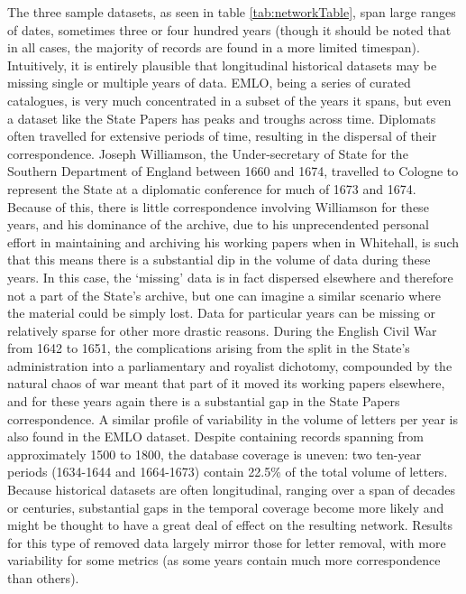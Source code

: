 \documentclass[]{article}
\begin{document}
The three sample datasets, as seen in table \ref{tab:networkTable}, span large ranges of dates, sometimes three or four hundred years (though it should be noted that in all cases, the majority of records are found in a more limited timespan). Intuitively, it is entirely plausible that longitudinal historical datasets may be missing single or multiple years of data. EMLO, being a series of curated catalogues, is very much concentrated in a subset of the years it spans, but even a dataset like the State Papers has peaks and troughs across time. Diplomats often travelled for extensive periods of time, resulting in the dispersal of their correspondence. Joseph Williamson, the Under-secretary of State for the Southern Department of England between 1660 and 1674, travelled to Cologne to represent the State at a diplomatic conference for much of 1673 and 1674. Because of this, there is little correspondence involving Williamson for these years, and his dominance of the archive, due to his unprecendented personal effort in maintaining and archiving his working papers when in Whitehall, is such that this means there is a substantial dip in the volume of data during these years. In this case, the `missing' data is in fact dispersed elsewhere and therefore not a part of the State's archive, but one can imagine a similar scenario where the material could be simply lost. Data for particular years can be missing or relatively sparse for other more drastic reasons. During the English Civil War from 1642 to 1651, the complications arising from the split in the State's administration into a parliamentary and royalist dichotomy, compounded by the natural chaos of war meant that part of it moved its working papers elsewhere, and for these years again there is a substantial gap in the State Papers correspondence. A similar profile of variability in the volume of letters per year is also found in the EMLO dataset. Despite containing records spanning from approximately 1500 to 1800, the database coverage is uneven: two ten-year periods (1634-1644 and 1664-1673) contain 22.5\% of the total volume of letters. Because historical datasets are often longitudinal, ranging over a span of decades or centuries, substantial gaps in the temporal coverage become more likely and might be thought to have a great deal of effect on the resulting network. Results for this type of removed data largely mirror those for letter removal, with more variability for some metrics (as some years contain much more correspondence than others).
\end{document}
